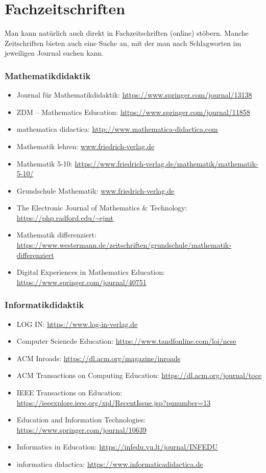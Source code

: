 \documentclass{../cssheet}
\begin{document}
\section{Fachzeitschriften}

Man kann natürlich auch direkt in Fachzeitschriften (online) stöbern. Manche Zeitschriften bieten auch eine Suche an, mit der man nach Schlagworten im jeweiligen Journal suchen kann.
\subsubsection*{Mathematikdidaktik}

\begin{itemize}
\item Journal für Mathematikdidaktik: \url{https://www.springer.com/journal/13138}
\item ZDM -- Mathematics Education: \url{https://www.springer.com/journal/11858}
\item mathematica didactica: \url{http://www.mathematica-didactica.com}
\item Mathematik lehren: \href{https://www.friedrich-verlag.de/mathematik/mathematik-lehren/}{www.friedrich-verlag.de}
\item Mathematik 5-10: \url{https://www.friedrich-verlag.de/mathematik/mathematik-5-10/}
\item Grundschule Mathematik: \href{https://www.friedrich-verlag.de/grundschule/mathematik/grundschule-mathematik/}{www.friedrich-verlag.de}
\item The Electronic Journal of Mathematics \& Technology: \url{https://php.radford.edu/~ejmt}
\item Mathematik differenziert: \url{https://www.westermann.de/zeitschriften/grundschule/mathematik-differenziert}
\item Digital Experiences in Mathematics Education: \url{https://www.springer.com/journal/40751}
\end{itemize}

\subsubsection*{Informatikdidaktik}
\begin{itemize}
\item LOG IN: \url{https://www.log-in-verlag.de}
\item Computer Sciencde Education: \url{https://www.tandfonline.com/loi/ncse}
\item ACM Inroads: \url{https://dl.acm.org/magazine/inroads}
\item ACM Transactions on Computing Education: \url{https://dl.acm.org/journal/toce}
\item IEEE Transactions on Education: \url{https://ieeexplore.ieee.org/xpl/RecentIssue.jsp?punumber=13}
\item Education and Information Technologies: \url{https://www.springer.com/journal/10639}
\item Informatics in Education: \url{https://infedu.vu.lt/journal/INFEDU}
\item informatica didactica: \url{https://www.informaticadidactica.de}
\end{itemize}
\end{document}
